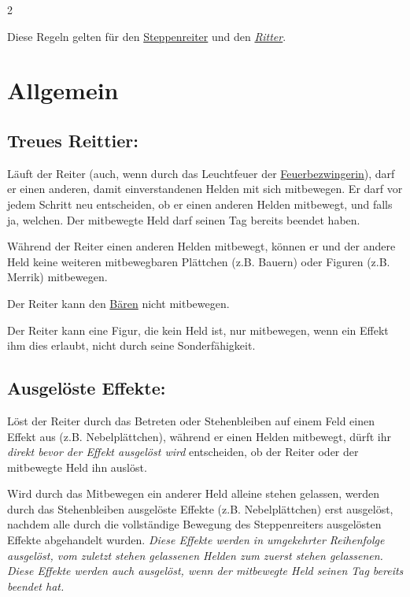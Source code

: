 \documentclass[10pt, a4paper, oneside]{book}
\newcommand{\fan}[1]{\textit{#1}}
\begin{document}
\begin{multicols*}{2}\raggedcolumns


\begin{nobgcolor}

Diese Regeln gelten für den \hyperref[Steppenreiter]{Steppenreiter} und den \fan{\hyperref[Ritter]{Ritter}}.


\section{Allgemein}

\subsection{Treues Reittier:}

Läuft der Reiter (auch, wenn durch das Leuchtfeuer der \hyperref[Feuerbezwingerin]{Feuerbezwingerin}\supercite{127533}), darf er einen anderen, damit einverstandenen\supercite{48981} Helden mit sich mitbewegen. Er darf vor jedem Schritt neu entscheiden, ob er einen anderen Helden mitbewegt, und falls ja, welchen. 
Der mitbewegte Held darf seinen Tag bereits beendet haben.
\supercite{DfL:Begleitheft}

Während der Reiter einen anderen Helden mitbewegt, können er und der andere Held keine weiteren mitbewegbaren Plättchen (z.B. Bauern) oder Figuren (z.B. Merrik) mitbewegen.
\supercite{40250,41284,45835}

Der Reiter kann den \hyperref[Hautwandler]{Bären} nicht mitbewegen.
\supercite{DH:Begleitheft}

Der Reiter kann eine Figur, die kein Held ist, nur mitbewegen, wenn ein Effekt ihm dies erlaubt, nicht durch seine Sonderfähigkeit.







\subsection{Ausgelöste Effekte:}

Löst der Reiter durch das Betreten oder Stehenbleiben auf einem Feld einen Effekt aus (z.B. Nebelplättchen), während er einen Helden mitbewegt, dürft ihr \fan{direkt bevor der Effekt ausgelöst wird} entscheiden, ob der Reiter oder der mitbewegte Held ihn auslöst.
\supercite{DfL:Begleitheft}

Wird durch das Mitbewegen ein anderer Held alleine stehen gelassen, werden durch das Stehenbleiben ausgelöste Effekte (z.B. Nebelplättchen) erst ausgelöst, nachdem alle durch die vollständige Bewegung des Steppenreiters ausgelösten Effekte abgehandelt wurden.
\supercite{DlH:FAQ}
\fan{Diese Effekte werden in umgekehrter Reihenfolge ausgelöst, vom zuletzt stehen gelassenen Helden zum zuerst stehen gelassenen. Diese Effekte werden auch ausgelöst, wenn der mitbewegte Held seinen Tag bereits beendet hat.}





\end{nobgcolor}
\end{multicols*}
\end{document}
